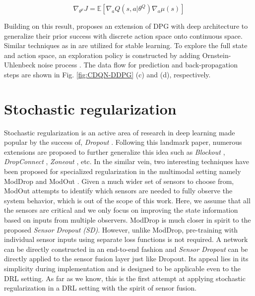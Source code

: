 \documentclass[../thesis.tex]{subfiles}
\begin{document}
\begin{equation}
\nabla_{\theta^\mu} J = \mathbb{E}[\nabla_a Q(s,a|\theta^Q) \nabla_a \mu(s)]
\label{dpg}
\end{equation}

 
Building on this result, \citet{DBLP:journals/corr/LillicrapHPHETS15} proposes an extension of DPG with deep architecture to generalize their prior success with discrete action space \cite{mnih2015human} onto continuous space. 
Similar techniques as in \cite{mnih2015human} are utilized for stable learning. 
To explore the full state and action space, an exploration policy is constructed by adding Ornstein-Uhlenbeck noise process \cite{uhlenbeck1930theory}. 
The data flow for prediction and back-propagation steps are shown in Fig. \ref{fig:CDQN-DDPG} (c) and (d), respectively.
 
 
\section{Stochastic regularization}
 
Stochastic regularization is an active area of research in deep learning made popular by the success of, \textit{Dropout} \cite{dropout}. Following this landmark paper, numerous extensions are proposed to further generalize this idea such as \textit{Blockout} \cite{blockout}, \textit{DropConnect} \cite{dropconnect}, \textit{Zoneout} \cite{zoneout}, etc. 
In the similar vein, two interesting techniques have been proposed for specialized regularization in the multimodal setting namely ModDrop \cite{moddrop} and ModOut \cite{modout}.
Given a much wider set of sensors to choose from, ModOut attempts to identify which sensors are needed to fully observe the system behavior, which is out of the scope of this work. 
Here, we assume that all the sensors are critical and we only focus on improving the state information based on inputs from multiple observers.
ModDrop is much closer in spirit to the proposed \emph{Sensor Dropout (SD)}. 
However, unlike ModDrop, pre-training with individual sensor inputs using separate loss functions is not required. 
A network can be directly constructed in an end-to-end fashion and \emph{Sensor Dropout} can be directly applied to the sensor fusion layer just like Dropout. 
Its appeal lies in its simplicity during implementation and is designed to be applicable even to the DRL setting. 
As far as we know, this is the first attempt at applying stochastic regularization in a DRL setting with the spirit of sensor fusion.
 
\end{document}
